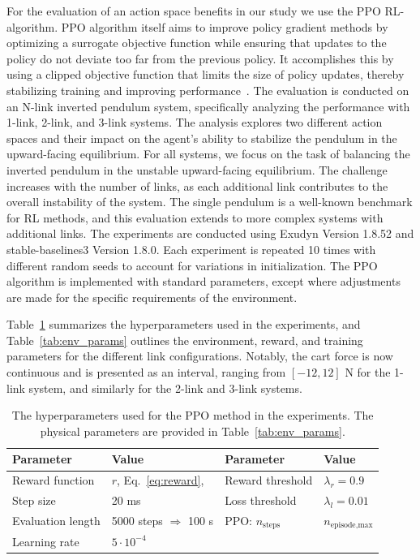 For the evaluation of an action space benefits in our study we use the PPO RL-algorithm. PPO algorithm itself aims to improve policy gradient methods by optimizing a surrogate objective function while ensuring that updates to the policy do not deviate too far from the previous policy. It accomplishes this by using a clipped objective function that limits the size of policy updates, thereby stabilizing training and improving performance~\cite{schulman2017ppo}. The evaluation is conducted on an N-link inverted pendulum system, specifically analyzing the performance with 1-link, 2-link, and 3-link systems. The analysis explores two different action spaces and their impact on the agent's ability to stabilize the pendulum in the upward-facing equilibrium. 
For all systems, we focus on the task of balancing the inverted pendulum in the unstable upward-facing equilibrium. The challenge increases with the number of links, as each additional link contributes to the overall instability of the system. The single pendulum is a well-known benchmark for RL methods, and this evaluation extends to more complex systems with additional links.
The experiments are conducted using Exudyn Version 1.8.52 and stable-baselines3 Version 1.8.0. Each experiment is repeated 10 times with different random seeds to account for variations in initialization. The PPO algorithm is implemented with standard parameters, except where adjustments are made for the specific requirements of the environment.

Table~\ref{tab:hyperparameters} summarizes the hyperparameters used in the experiments, and Table~\ref{tab:env_params} outlines the environment, reward, and training parameters for the different link configurations. Notably, the cart force is now continuous and is presented as an interval, ranging from \([-12, 12]\) N for the 1-link system, and similarly for the 2-link and 3-link systems.

\begin{table}[h]
	\centering
	\caption{The hyperparameters used for the PPO method in the experiments. The physical parameters are provided in Table~\ref{tab:env_params}.}
	\label{tab:hyperparameters}
	\begin{tabular}{ll|ll}
		\toprule
		\textbf{Parameter}       & \textbf{Value} & \textbf{Parameter}       & \textbf{Value} \\ \midrule
		Reward function          & $r$, Eq.~\ref{eq:reward},  & Reward threshold         & $\lambda_r = 0.9$ \\ 
		Step size                & 20 ms           & Loss threshold           & $\lambda_l = 0.01$ \\ 
		Evaluation length        & 5000 steps $\Rightarrow$ 100 s & PPO: $n_{\text{steps}}$       & $n_{\text{episode,max}}$ \\ 
		Learning rate      & $5 \cdot 10^{-4}$ & & \\ \bottomrule
	\end{tabular}
\end{table}

